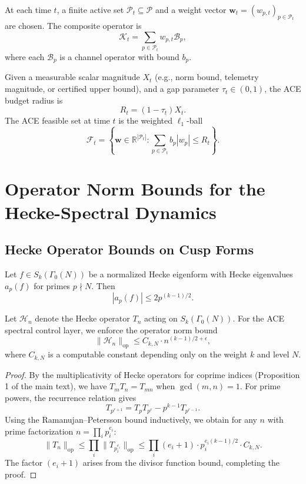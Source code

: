 \documentclass[11pt]{article}
\begin{document}
\begin{definition}
At each time $t$, a finite active set $\mathcal{P}_t \subseteq \mathcal{P}$ and a weight vector $\mathbf{w}_t = (w_{p,t})_{p \in \mathcal{P}_t}$ are chosen. The composite operator is
\[
\mathcal{K}_t = \sum_{p \in \mathcal{P}_t} w_{p,t} \mathcal{B}_p,
\]
where each $\mathcal{B}_p$ is a channel operator with bound $b_p$.
\end{definition}

\begin{definition}
Given a measurable scalar magnitude $X_t$ (e.g., norm bound, telemetry magnitude, or certified upper bound), and a gap parameter $\tau_t \in (0,1)$, the ACE budget radius is
\[
R_t = (1 - \tau_t) X_t.
\]
The ACE feasible set at time $t$ is the weighted $\ell_1$-ball
\[
\mathcal{F}_t = \left\{ \mathbf{w} \in \mathbb{R}^{|\mathcal{P}_t|} : \sum_{p \in \mathcal{P}_t} b_p |w_p| \leq R_t \right\}.
\]
\end{definition}

\section{Operator Norm Bounds for the Hecke-Spectral Dynamics}

\subsection{Hecke Operator Bounds on Cusp Forms}

\begin{theorem}
Let $f \in S_k(\Gamma_0(N))$ be a normalized Hecke eigenform with Hecke eigenvalues $a_p(f)$ for primes $p \nmid N$. Then
\[
|a_p(f)| \leq 2 p^{(k-1)/2}.
\]
\end{theorem}

\begin{proposition}
Let $\mathcal{H}_n$ denote the Hecke operator $T_n$ acting on $S_k(\Gamma_0(N))$. For the ACE spectral control layer, we enforce the operator norm bound
\[
\|\mathcal{H}_n\|_{\mathrm{op}} \leq C_{k,N} \cdot n^{(k-1)/2 + \epsilon},
\]
where $C_{k,N}$ is a computable constant depending only on the weight $k$ and level $N$.
\end{proposition}

\begin{proof}
By the multiplicativity of Hecke operators for coprime indices (Proposition 1 of the main text), we have $T_m T_n = T_{mn}$ when $\gcd(m,n) = 1$. For prime powers, the recurrence relation gives
\[
T_{p^{r+1}} = T_p T_{p^r} - p^{k-1} T_{p^{r-1}}.
\]
Using the Ramanujan--Petersson bound inductively, we obtain for any $n$ with prime factorization $n = \prod_{i} p_i^{e_i}$:
\[
\|T_n\|_{\mathrm{op}} \leq \prod_{i} \|T_{p_i^{e_i}}\|_{\mathrm{op}} \leq \prod_{i} (e_i + 1) \cdot p_i^{e_i(k-1)/2} \cdot C_{k,N}.
\]
The factor $(e_i + 1)$ arises from the divisor function bound, completing the proof.
\end{proof}
\end{document}
